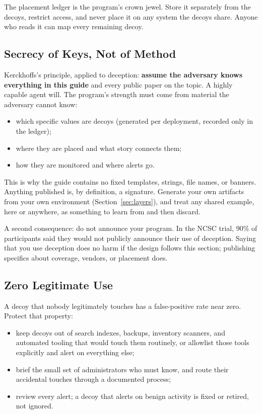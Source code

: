 \documentclass[11pt,letterpaper]{article}
\begin{document}
\begin{warnbox}
The placement ledger is the program's crown jewel. Store it separately from the decoys, restrict access, and never place it on any system the decoys share. Anyone who reads it can map every remaining decoy.
\end{warnbox}

\subsection{Secrecy of Keys, Not of Method}
\label{sec:secrecy}

Kerckhoffs's principle, applied to deception: \textbf{assume the adversary knows everything in this guide} and every public paper on the topic. A highly capable agent will. The program's strength must come from material the adversary cannot know:

\begin{itemize}
  \item which specific values are decoys (generated per deployment, recorded only in the ledger);
  \item where they are placed and what story connects them;
  \item how they are monitored and where alerts go.
\end{itemize}

This is why the guide contains no fixed templates, strings, file names, or banners. Anything published is, by definition, a signature. Generate your own artifacts from your own environment (Section~\ref{sec:layers}), and treat any shared example, here or anywhere, as something to learn from and then discard.

A second consequence: do not announce your program. In the NCSC trial, 90\% of participants said they would not publicly announce their use of deception. Saying that you use deception does no harm if the design follows this section; publishing specifics about coverage, vendors, or placement does.

\subsection{Zero Legitimate Use}
\label{sec:zerouse}

A decoy that nobody legitimately touches has a false-positive rate near zero. Protect that property:

\begin{itemize}
  \item keep decoys out of search indexes, backups, inventory scanners, and automated tooling that would touch them routinely, or allowlist those tools explicitly and alert on everything else;
  \item brief the small set of administrators who must know, and route their accidental touches through a documented process;
  \item review every alert; a decoy that alerts on benign activity is fixed or retired, not ignored.
\end{itemize}
\end{document}

